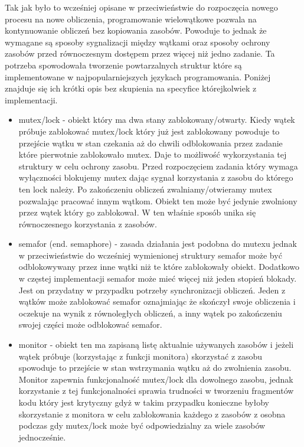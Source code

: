 Tak jak było to wcześniej opisane w przeciwieństwie do rozpoczęcia nowego procesu na nowe obliczenia, programowanie wielowątkowe pozwala na kontynuowanie obliczeń bez kopiowania zasobów. 
Powoduje to jednak że wymagane są sposoby sygnalizacji między wątkami oraz sposoby ochrony zasobów przed równoczesnym dostępem przez więcej niż jedno zadanie. 
Ta potrzeba spowodowała tworzenie powtarzalnych struktur które są implementowane w najpopularniejszych językach programowania. 
Poniżej znajduje się ich krótki opis bez skupienia na specyfice którejkolwiek z implementacji. 
\begin{itemize}
        \item mutex/lock - obiekt który ma dwa stany zablokowany/otwarty.
        Kiedy wątek próbuje zablokować mutex/lock który już jest zablokowany powoduje to przejście wątku w stan czekania aż do chwili odblokowania przez zadanie które pierwotnie zablokowało mutex.
        Daje to możliwość wykorzystania tej struktury w celu ochrony zasobu. Przed rozpoczęciem zadania który wymaga wyłączności blokujemy mutex dając sygnał korzystania z zasobu do którego ten lock należy. 
        Po zakończeniu obliczeń zwalniamy/otwieramy mutex pozwalając pracować innym wątkom. Obiekt ten może być jedynie zwolniony przez wątek który go zablokował. 
        W ten właśnie sposób unika się równoczesnego korzystania z zasobów. 
        \item semafor (end. semaphore) - zasada działania jest podobna do mutexu jednak w przeciwieństwie do wcześniej wymienionej struktury semafor może być odblokowywany przez inne wątki niż te które zablokowały obiekt. Dodatkowo w częstej implementacji semafor może mieć więcej niż jeden stopień blokady. 
        Jest on przydatny w przypadku potrzeby synchronizacji obliczeń. Jeden z wątków może zablokować semafor oznajmiając że skończył swoje obliczenia i oczekuje na wynik z równoległych obliczeń, a inny wątek po zakończeniu swojej części może odblokować semafor. 
        \item monitor - obiekt ten ma zapisaną listę aktualnie używanych zasobów i jeżeli wątek próbuje (korzystając z funkcji monitora) skorzystać z zasobu spowoduje to przejście w stan wstrzymania wątku aż do zwolnienia zasobu. 
        Monitor zapewnia funkcjonalność mutex/lock dla dowolnego zasobu, jednak korzystanie z tej funkcjonalności sprawia trudności w tworzeniu fragmentów kodu który jest krytyczny gdyż w takim przypadku konieczne byłoby skorzystanie z monitora w celu zablokowania każdego z zasobów z osobna podczas gdy mutex/lock może być odpowiedzialny za wiele zasobów jednocześnie.   
\end{itemize} 

